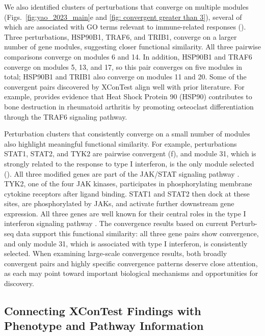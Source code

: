 \documentclass[11pt]{article}
\begin{document}
We also identified clusters of perturbations that converge on multiple modules (Figs.~\ref{fig:yao_2023_main}e and \ref{fig: convergent greater than 3}), several of which are associated with GO terms relevant to immune-related responses (). Three perturbations, HSP90B1, TRAF6, and TRIB1, converge on a larger number of gene modules, suggesting closer functional similarity. All three pairwise comparisons converge on modules 6 and 14. In addition,
HSP90B1 and TRAF6 converge on modules 5, 13, and 17, so this pair converges on five modules in total; HSP90B1 and TRIB1 also converge on modules 11 and 20. Some of the convergent pairs discovered by XConTest align well with prior literature. For example, \cite{wang2024hsp90} provides evidence that Heat Shock Protein 90 (HSP90) contributes to bone destruction in rheumatoid arthritis by promoting osteoclast differentiation through the TRAF6 signaling pathway.

Perturbation clusters that consistently converge on a small number of modules also highlight meaningful functional similarity. For example, perturbations STAT1, STAT2, and TYK2 are pairwise convergent (f), and module 31, which is strongly related to the response to type I interferon, is the only module selected (). All three modified genes are part of the JAK/STAT signaling pathway \citep{rawlings2004jak, hu2021jak}. TYK2, one of the four JAK kinases, participates in phosphorylating membrane cytokine receptors after ligand binding. STAT1 and STAT2 then dock at these sites, are phosphorylated by JAKs, and activate further downstream gene expression. All three genes are well known for their central roles in the type I interferon signaling pathway \citep{velazquez1992protein,qureshi1995tyrosine,prchal2012tyk2}. The convergence results based on current Perturb-seq data support this functional similarity: all three gene pairs show convergence, and only module 31, which is associated with type I interferon, is consistently selected. When examining large-scale convergence results, both broadly convergent pairs and highly specific convergence patterns deserve close attention, as each may point toward important biological mechanisms and opportunities for discovery.

\subsection*{Connecting XConTest Findings with Phenotype and  Pathway Information}
\end{document}

